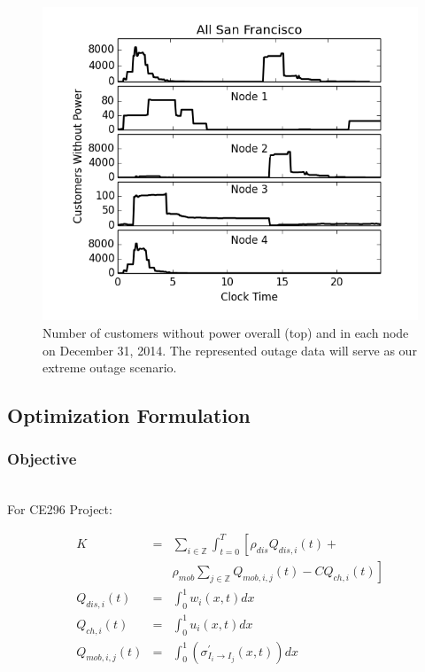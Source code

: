 \documentclass[journal]{IEEEtran}
\begin{document}
\begin{figure}
  \label{fig:extreme_day}
  \caption{Number of customers without power overall (top) and in each node on December 31, 2014. The represented outage data will serve as our extreme outage scenario.}
  \includegraphics[width=\linewidth]{plots/extreme_day_20141231.png}
\end{figure}

\subsection{Optimization Formulation}

\subsubsection{Objective}
~ \\

For CE296 Project:

\begin{eqnarray*}
    K &=& \sum_{i\in\mathbb{Z}} \int_{t=0}^{T} \left[ \rho_{dis} Q_{dis,i}(t) + \right. \\ 
    && \left. \rho_{mob}\sum_{j\in\mathbb{Z}}Q_{mob,i,j}(t)  - CQ_{ch,i}(t) \right]\\
    Q_{dis,i}(t) & = & \int_{0}^{1} w_i(x,t) dx \\
    Q_{ch,i}(t) & = & \int_{0}^{1} u_i(x,t) dx \\
    Q_{mob,i,j}(t) & = & \int_{0}^{1}\left( \sigma_{I_i \rightarrow I_j}^\prime(x,t) \right)dx
\end{eqnarray*}
\end{document}

